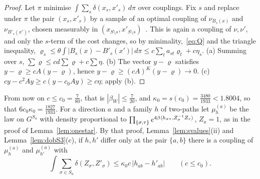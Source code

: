 \begin{proof}
Let $\pi$ minimise $\int\sum_s\delta(x_s,x'_s)\,d\pi$ over couplings. Fix $s$
and replace under $\pi$ the pair $(x_s,x'_s)$ by a sample of an optimal
coupling of $\nu_{B_s(x)}$ and $\nu_{B'_s(x')}$, chosen measurably in
$(x_{S\setminus s},x'_{S\setminus s})$~\cite[Cor.~5.22]{Vil09}. This is again
a coupling of $\nu,\nu'$, and only the $s$-term of the cost changes, so by
minimality,~\eqref{eq:Q} and the triangle inequality, $\varrho_s\le\theta\int
|B_s(x)-B'_s(x')|\,d\pi\le c\sum_ta_{st}\varrho_t+c\eta_s$. (a) Summing over
$s$, $\sum\varrho\le cd\sum\varrho+c\sum\eta$. (b) The vector $y-\varrho$
satisfies $y-\varrho\ge cA(y-\varrho)$, hence $y-\varrho\ge(cA)^K(y-\varrho)
\to0$. (c) $cy-c^2Ay\ge c(y-c_0Ay)\ge c\eta$; apply (b).
\end{proof}

From now on $c\le c_0=\frac7{80}$, that is $|\beta_W|\le\frac7{20}$, and
$\kappa_0=s(c_0)=\frac{3480}{1933}<1.8004$, so that $6c_0\kappa_0=
\frac{1827}{1933}$. For a direction $a$ and a family $h$ of two-paths let
$\mu^{(a)}_h$ be the law on $G^{S_a}$ with density proportional to
$\prod_{\{\sigma,\tau\}}e^{4\beta\langle h_{\sigma\tau},Z_\sigma^{-1}Z_\tau\rangle}$,
$Z_a=1$, as in the proof of Lemma~\ref{lem:onestar}. By that proof,
Lemma~\ref{lem:svalues}(ii) and Lemma~\ref{lem:dobS3}(c), if $h,h'$ differ only
at the pair $\{a,b\}$ there is a coupling of $\mu^{(a)}_h$ and $\mu^{(a)}_{h'}$
with
\begin{equation}\label{eq:sevenbound}
\int\sum_{\sigma\in S_a}\delta(Z_\sigma,Z'_\sigma)\le\kappa_0c\,
|h_{ab}-h'_{ab}|\qquad(c\le c_0).
\end{equation}

